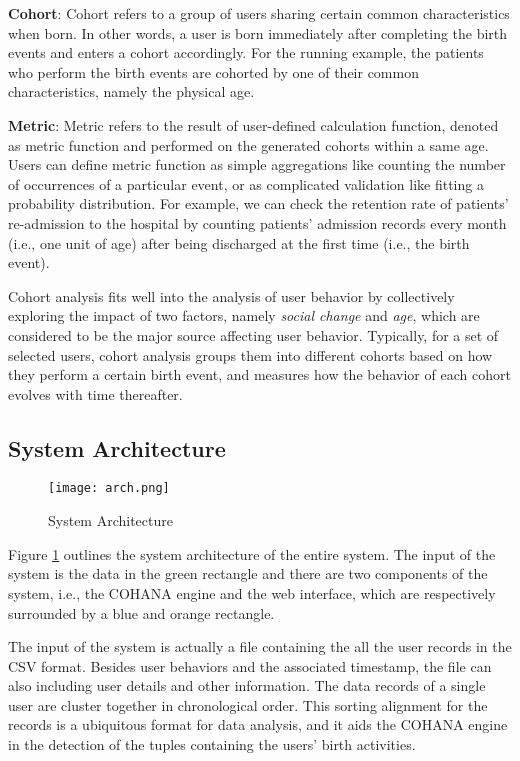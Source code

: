 \textbf{Cohort}: Cohort refers to a group of users sharing certain common characteristics when born. In other words, a user is born immediately after completing the birth events and enters a cohort accordingly. For the running example, the patients who perform the birth events are cohorted by one of their common characteristics, namely the physical age.

\textbf{Metric}: Metric refers to the result of user-defined calculation function, denoted as metric function and performed on the generated cohorts within a same age. Users can define metric function as simple aggregations like counting the number of occurrences of a particular event, or as complicated validation like fitting a probability distribution. For example, we can check the retention rate of patients' re-admission to the hospital by counting patients' admission records every month (i.e., one unit of age) after being discharged at the first time (i.e., the birth event).

Cohort analysis fits well into the analysis of user behavior by collectively exploring the impact of two factors, namely \emph{social change} and \emph{age}, which are considered to be the major source affecting user behavior. Typically, for a set of selected users, cohort analysis groups them into different cohorts based on how they perform a certain birth event, and measures how the behavior of each cohort evolves with time thereafter.

\subsection{System Architecture}

\begin{figure}
    \centering
    \texttt{[image: arch.png]}
    \caption{System Architecture}
    \label{fig:sys_arch}
\end{figure}

Figure \ref{fig:sys_arch} outlines the system architecture of the entire system. The input of the system is the data in the green rectangle and there are two components of the system, i.e., the COHANA engine and the web interface, which are respectively surrounded by a blue and orange rectangle. 

The input of the system is actually a file containing the all the user records in the CSV format. 
Besides user behaviors and the associated timestamp, the file can also 
including user details and other information.
The data records of a single user are cluster together in chronological order. 
This sorting alignment for the records is a ubiquitous format for data analysis, and it aids the COHANA engine in the detection of the tuples containing the users' birth activities.

